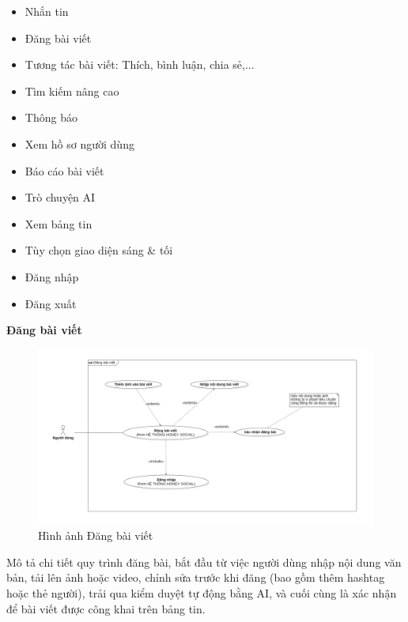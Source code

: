 \begin{itemize}
    \item Nhắn tin
    \item Đăng bài viết
    \item Tương tác bài viết: Thích, bình luận, chia sẻ,...
    \item Tìm kiếm nâng cao
    \item Thông báo
    \item Xem hồ sơ người dùng
    \item Báo cáo bài viết
    \item Trò chuyện AI
    \item Xem bảng tin
    \item Tùy chọn giao diện sáng \& tối
    \item Đăng nhập
    \item Đăng xuất
\end{itemize}

\textbf{Đăng bài viết} \\
\begin{figure}[H]
    \centering
    \includegraphics[width=1\textwidth]{image/MoHinh/2.png}
    \caption{Hình ảnh Đăng bài viết}
    \label{fig:dang_bai_viet_seq}
\end{figure}
Mô tả chi tiết quy trình đăng bài, bắt đầu từ việc người dùng nhập nội dung văn bản, tải lên ảnh hoặc video, chỉnh sửa trước khi đăng (bao gồm thêm hashtag hoặc thẻ người), trải qua kiểm duyệt tự động bằng AI, và cuối cùng là xác nhận để bài viết được công khai trên bảng tin.

